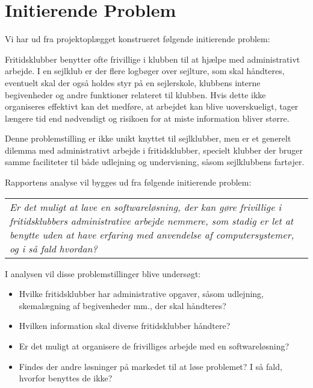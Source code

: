 \section{Initierende Problem}
Vi har ud fra projektoplægget konstrueret følgende initierende problem: 

Fritidsklubber benytter ofte frivillige i klubben til at hjælpe med administrativt arbejde. \citep{Frivilligrapporten}
I en sejlklub er der flere logbøger over sejlture, som skal håndteres, eventuelt skal der også holdes styr på en sejlerskole, klubbens interne begivenheder og andre funktioner relateret til klubben. 
Hvis dette ikke organiseres effektivt kan det medføre, at arbejdet kan blive uoverskueligt, tager længere tid end nødvendigt og risikoen for at miste information bliver større.

Denne problemstilling er ikke unikt knyttet til sejlklubber, men er et generelt dilemma med administrativt arbejde i fritidsklubber, specielt klubber der bruger samme faciliteter til både udlejning og undervisning, såsom sejlklubbens fartøjer.  

Rapportens analyse vil bygges ud fra følgende initierende problem:
\begin{center}
  \begin{tabular}{|p{14cm}|}
	\textit{Er det muligt at lave en softwareløsning, der kan gøre frivillige i fritidsklubbers administrative
	arbejde nemmere, som stadig er let at benytte uden at have  erfaring med anvendelse af computersystemer, og i så fald hvordan?}
  \end{tabular}
\end{center}

I analysen vil disse problemstillinger blive undersøgt:

\begin{itemize}
  \item Hvilke fritidsklubber har administrative opgaver, såsom udlejning, skemalægning af begivenheder mm., der
        skal håndteres?
  \item Hvilken information skal diverse fritidsklubber håndtere?
  \item Er det muligt at organisere de frivilliges arbejde med en softwareløsning?
  \item Findes der andre løsninger på markedet til at løse problemet? I så fald, hvorfor benyttes de ikke?
\end{itemize}